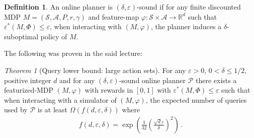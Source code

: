 \documentclass{article}
\DeclareMathOperator*{\1}{\mathbbm{1}}
\newcommand{\0}{\mathbf{0}}
\theoremstyle{definition}
\newtheorem{definition}{Definition}
\theoremstyle{remark}
\theoremstyle{theorem}
\newtheorem{theorem}{Theorem}
\begin{document}
\begin{definition}
An online planner is $(\delta,\varepsilon)$-sound if
for any finite discounted MDP $M=(\mathcal{S},\mathcal{A},P,r,\gamma)$
and feature-map $\varphi:\mathcal{S}\times \mathcal{A}\to \mathbb{R}^d$ such that
$\varepsilon^*(M,\Phi)\le \varepsilon$,
when interacting with $(M,\varphi)$, the planner induces a $\delta$-suboptimal policy of $M$.
\end{definition}

\noindent The following was proven in the said lecture:

\begin{theorem}[Query lower bound: large action sets]
\label{thm:qlb}
\label{thm:melesslb}
For any $\varepsilon>0$, $0<\delta\le 1/2$, positive integer $d$
and
for any $(\delta,\varepsilon)$-sound online planner $\mathcal{P}$
there exists a featurized-MDP $(M,\varphi)$ with rewards in $[0,1]$ with $\varepsilon^*(M,\Phi)\le \varepsilon$ such that
when interacting with a simulator of $(M,\varphi)$,
the expected number of queries used by
$\mathcal{P}$ 
is at least $\Omega(f(d,\varepsilon,\delta))$ where
\begin{align*}
f(d,\varepsilon,\delta) = \exp\left( \frac{1}{32} \left(\frac{\sqrt{d}\varepsilon}{\delta}\right)^2 \right)\,.
\end{align*}
\end{theorem}
\end{document}
